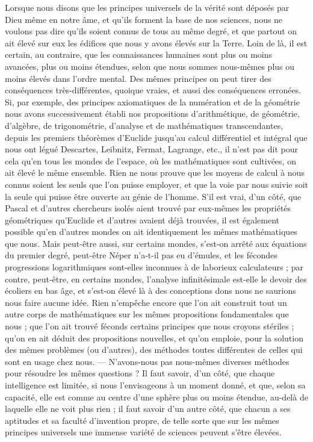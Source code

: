 \documentclass[a4paper, 11pt, oneside]{article}
\begin{document}
Lorsque nous disons que les principes universels de la vérité sont déposés par Dieu même en notre âme, et qu'ils forment la base de nos sciences, nous ne voulons pas dire qu'ils soient connus de tous au même degré, et que partout on ait élevé sur eux les édifices que nous y avons élevés sur la Terre. Loin de là, il est certain, au contraire, que les connaissances humaines sont plus ou moins avancées, plus ou moins étendues, selon que nous sommes nous-mêmes plus ou moins élevés dans l'ordre mental. Des mêmes principes on peut tirer des conséquences très-différentes, quoique vraies, et aussi des conséquences erronées. Si, par exemple, des principes axiomatiques de la numération et de la géométrie nous avons successivement établi nos propositions d'arithmétique, de géométrie, d'algèbre, de trigonométrie, d'analyse et de mathématiques transcendantes, depuis les premiers théorèmes d'Euclide jusqu'au calcul différentiel et intégral que nous ont légué Descartes, Leibnitz, Fermat, Lagrange, etc., il n'est pas dit pour cela qu'en tous les mondes de l'espace, où les mathématiques sont cultivées, on ait élevé le même ensemble. Rien ne nous prouve que les moyens de calcul à nous connus soient les seuls que l'on puisse employer, et que la voie par nous suivie soit la seule qui puisse être ouverte au génie de l'homme. S'il est vrai, d'un côté, que Pascal et d'autres chercheurs isolés aient trouvé par eux-mêmes les propriétés géométriques qu'Euclide et d'autres avaient déjà trouvées, il est également possible qu'en d'autres mondes on ait identiquement les mêmes mathématiques que nous. Mais peut-être aussi, sur certains mondes, s'est-on arrêté aux équations du premier degré, peut-être Néper n'a-t-il pas eu d'émules, et les fécondes progressions logarithmiques sont-elles inconnues à de laborieux calculateurs ; par contre, peut-être, en certains mondes, l'analyse infinitésimale est-elle le devoir des écoliers en bas âge, et s'est-on élevé là à des conceptions dons nous ne saurions nous faire aucune idée. Rien n'empêche encore que l'on ait construit tout un autre corps de mathématiques sur les mêmes propositions fondamentales que nous ; que l'on ait trouvé féconds certains principes que nous croyons stériles ; qu'on en ait déduit des propositions nouvelles, et qu'on emploie, pour la solution des mêmes problèmes (ou d'autres), des méthodes toutes différentes de celles qui sont en usage chez nous. --- N'avons-nous pas nous-mêmes diverses méthodes pour résoudre les mêmes questions ? Il faut savoir, d'un côté, que chaque intelligence est limitée, si nous l'envisageons à un moment donné, et que, selon sa capacité, elle est comme au centre d'une sphère plus ou moins étendue, au-delà de laquelle elle ne voit plus rien ; il faut savoir d'un autre côté, que chacun a ses aptitudes et sa faculté d'invention propre, de telle sorte que sur les mêmes principes universels une immense variété de sciences peuvent s'être élevées.
\end{document}
